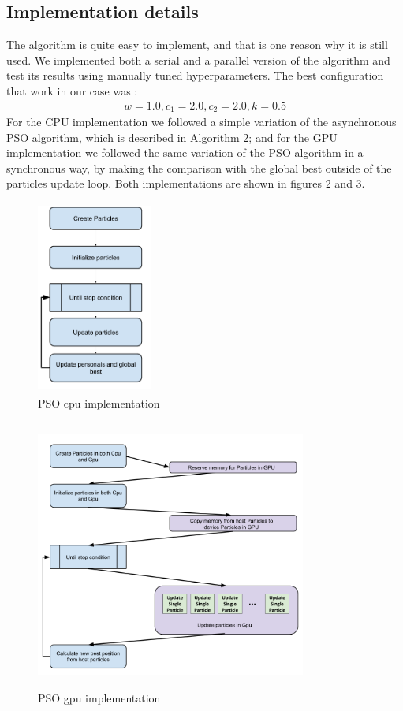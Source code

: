 \documentclass[journal]{IEEEtran}
\begin{document}
\subsection{Implementation details}

The algorithm is quite easy to implement, and that is one reason why it is still used. We implemented both a serial and a parallel version of the algorithm and test its results using manually tuned hyperparameters. The best configuration that work in our case was :
\begin{gather}
    w = 1.0,c_{1} = 2.0, c_{2} = 2.0, k = 0.5
\end{gather}
For the CPU implementation we followed a simple variation of the asynchronous PSO algorithm, which is described in Algorithm 2; and for the GPU implementation we followed the same variation of the PSO algorithm in a synchronous way, by making the comparison with the global best outside of the particles update loop. Both implementations are shown in figures 2 and 3.

\begin{figure}[H]
\centering
\includegraphics[width=1.5in,height=2.5in]{_img/img_PSO_algorithm_cpu.png}
\caption{PSO cpu implementation}
\end{figure}

\begin{figure}[H]
\centering
\includegraphics[width=3.5in,height=3.5in]{_img/img_PSO_algorithm_gpu.png}
\caption{PSO gpu implementation}
\end{figure}
\end{document}
